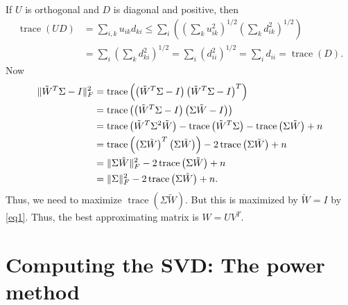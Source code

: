 \documentclass{article}
\begin{document}
If $U$ is orthogonal and $D$ is diagonal and positive, then
\begin{equation}\label{eq1}
\begin{aligned}
\operatorname{trace} (UD) &= \sum_{i,k} u_{ik} d_{ki} \leq \sum _{i}
\left ( \left ( \sum_{k} u_{ik}^{2} \right )^{1/2} \left ( \sum_{k}
d_{ik}^{2} \right )^{1/2} \right ) \\
&= \sum_{i} \left ( \sum_{k} d_{ki}^{2} \right )^{1/2} = \sum_{i}
\left ( d_{ii}^{2} \right )^{1/2} = \sum_{i} d_{ii} =
\operatorname{trace}(D).
\end{aligned}
\end{equation}
Now
\begin{align*}
\| \tilde{W}^{T} \Sigma - I \|_{F}^{2} &= \operatorname{trace}
\left ( \left( \tilde{W}^{T} \Sigma - I \right ) \left(
\tilde{W}^{T} \Sigma - I \right )^{T} \right ) \\
&= \operatorname{trace} \left ( \left( \tilde{W}^{T} \Sigma   - I
\right
) \left( \Sigma \tilde{W}  - I \right ) \right ) \\
&= \operatorname{trace} \left ( \tilde{W}^{T} \Sigma^{2} \tilde{W}
\right ) - \operatorname{trace} \left ( \tilde{W}^{T} \Sigma \right
) - \operatorname{trace} \left ( \Sigma \tilde{W} \right ) + n \\
&= \operatorname{trace} \left ( \left ( \Sigma \tilde{W} \right
)^{T} \left ( \Sigma \tilde{W}  \right ) \right ) - 2
\operatorname{trace} \left (\Sigma \tilde{W} \right ) + n \\
&= \| \Sigma \tilde{W} \|_{F}^{2} - 2 \operatorname{trace} \left
(\Sigma \tilde{W} \right ) + n \\
&= \| \Sigma  \|_{F}^{2} - 2 \operatorname{trace} \left (\Sigma
\tilde{W} \right ) + n.
\end{align*}
Thus, we need to maximize $\operatorname{trace} \left (\Sigma
\tilde{W} \right )$. But this is maximized by $ \tilde{W} = I$ by
\eqref{eq1}. Thus, the best approximating matrix is $W=UV^{T}$.





\section{Computing the SVD: The power method}
\end{document}

